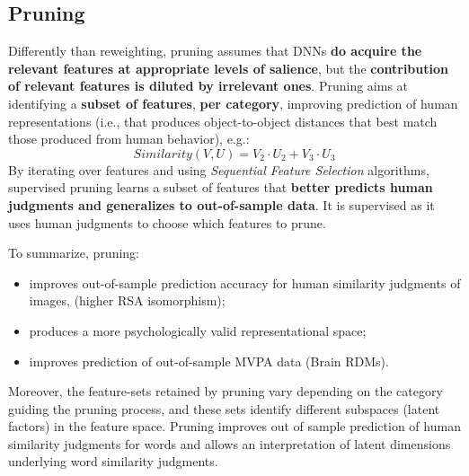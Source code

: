 \subsection{Pruning}
Differently than reweighting, pruning assumes that DNNs \textbf{do acquire the relevant features at appropriate levels of salience}, but the \textbf{contribution of relevant features is diluted by irrelevant ones}. Pruning aims at identifying a \textbf{subset of features}, \textbf{per category}, improving prediction of human representations (i.e., that produces object-to-object distances that best match those produced from human behavior), e.g.:
\[
    Similarity(V,U) = V_2 \cdot U_2 + V_3 \cdot U_3
\]
By iterating over features and using \textit{Sequential Feature Selection} algorithms, supervised pruning learns a subset of features that \textbf{better predicts human judgments and generalizes to out-of-sample data}. It is supervised as it uses human judgments to choose which features to prune.

To summarize, pruning:
\begin{itemize}
    \item improves out-of-sample prediction accuracy for human similarity judgments of images, (higher RSA isomorphism);
    \item produces a more psychologically valid representational space;
    \item improves prediction of out-of-sample MVPA data (Brain RDMs).
\end{itemize}
Moreover, the feature-sets retained by pruning vary depending on the category guiding the pruning process, and these sets identify different subspaces (latent factors) in the feature space.
Pruning improves out of sample prediction of human similarity judgments for words and allows an interpretation of latent dimensions underlying word similarity judgments.

